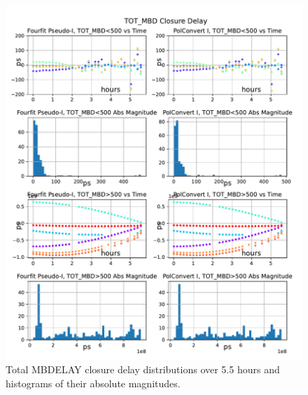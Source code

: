\documentclass[letterpaper,twoside,12pt]{article}
\begin{document}
\begin{figure}[ht!]
  \begin{center}
  \includegraphics[width=35pc]{TOT_MBD_Closure_Delay.pdf}
  \caption{\small Total MBDELAY closure delay distributions over 5.5 hours and histograms of their absolute magnitudes.}
  \label{tot_mbd}
  \end{center}
\end{figure}
\end{document}
